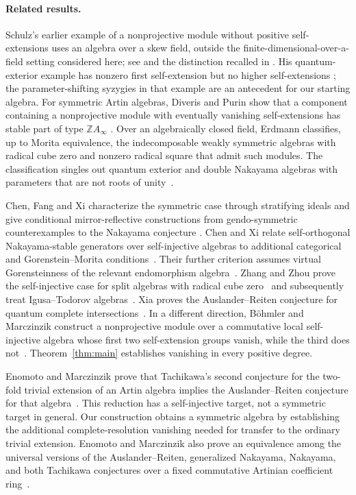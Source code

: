 \paragraph{Related results.}
Schulz's earlier example of a nonprojective module without positive
self-extensions uses an algebra over a skew field, outside the
finite-dimensional-over-a-field setting considered here; see
\cite{Schulz1994} and the distinction recalled in
\cite[Introduction]{DiverisPurin2012}.
His quantum-exterior example has nonzero first self-extension but no
higher self-extensions
\cite[Example~7]{Schulz1995}; the parameter-shifting syzygies in that
example are an antecedent for our starting algebra.
For symmetric Artin algebras, Diveris and Purin show that a component
containing a nonprojective module with eventually vanishing
self-extensions has stable part of type $\mathbb Z A_\infty$
\cite[Theorem~A]{DiverisPurin2014}.
Over an algebraically closed field, Erdmann classifies, up to Morita
equivalence, the indecomposable
weakly symmetric algebras with radical cube zero and nonzero radical
square that admit such modules. The classification singles out quantum
exterior and double Nakayama algebras with parameters that are not roots
of unity~\cite[Theorem~1.1]{Erdmann2017}.

Chen, Fang and Xi characterize the symmetric case through stratifying
ideals and give conditional mirror-reflective constructions from
gendo-symmetric counterexamples to the Nakayama conjecture
\cite[Theorems~1.1 and~1.2]{ChenFangXi2024}.
Chen and Xi relate self-orthogonal Nakayama-stable generators over
self-injective algebras to additional categorical and
Gorenstein--Morita conditions~\cite[Theorem~1.2 and Corollary~1.4]{ChenXi2025TAMS}.
Their further criterion assumes virtual Gorensteinness of the relevant
endomorphism algebra~\cite[Theorem~1.3]{ChenXi2025VG}.
Zhang and Zhou prove the self-injective case for split algebras with
radical cube zero~\cite[Corollary~4.2]{ZhangZhou2026} and subsequently
treat Igusa--Todorov algebras~\cite[Theorem~3.2]{ZhangZhouIgusaTodorov2026}.
Xia proves the Auslander--Reiten conjecture for quantum complete
intersections~\cite[Corollary~4.3]{Xia2026}.
In a different direction, B\"ohmler and Marczinzik construct a
nonprojective module over a commutative local self-injective algebra
whose first two self-extension groups vanish, while the third does
not~\cite[Theorem~3.1 and the end of Section~3]{BohmlerMarczinzik2026}.
Theorem~\ref{thm:main} establishes vanishing in every positive degree.

Enomoto and Marczinzik prove that Tachikawa's second conjecture for the
two-fold trivial extension of an Artin algebra implies the Auslander--Reiten
conjecture for that algebra~\cite[Theorem~3.5]{Enomoto2026}.
This reduction has a self-injective target, not a symmetric target in
general. Our construction obtains a symmetric algebra by establishing
the additional complete-resolution vanishing needed for transfer to
the ordinary trivial extension.
Enomoto and Marczinzik also prove an equivalence among the universal
versions of the Auslander--Reiten, generalized Nakayama, Nakayama,
and both Tachikawa conjectures
over a fixed commutative Artinian coefficient
ring~\cite[Theorem~1.1]{Enomoto2026}.

